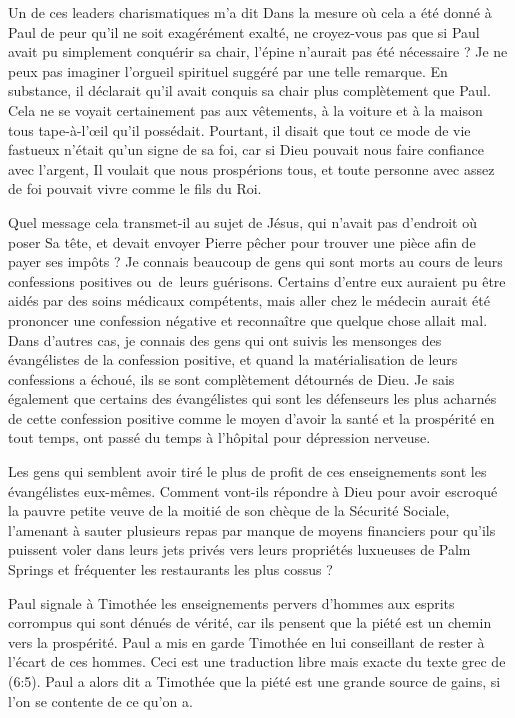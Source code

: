 Un de ces leaders charismatiques m'a dit\frcolon{}
 \Og Dans la mesure où cela a été donné à Paul de peur
 qu'il ne soit exagérément exalté, ne croyez-vous pas que si Paul
 avait pu simplement conquérir sa chair, l'épine n'aurait pas
 été nécessaire ? \Fg{}
 Je ne peux pas imaginer l'orgueil spirituel suggéré par une telle remarque.
 En substance, il déclarait qu'il avait conquis sa chair
 plus complètement que Paul. Cela ne se voyait certainement pas
 aux vêtements, à la voiture et à la maison tous tape-à-l'œil
 qu'il possédait. Pourtant, il disait que tout ce mode de vie
 fastueux n'était qu'un signe de sa foi, car si Dieu pouvait nous faire
 confiance avec l'argent, Il voulait que nous prospérions tous,
 et toute personne avec assez de foi pouvait vivre comme le fils du Roi.

Quel message cela transmet-il au sujet de Jésus, qui n'avait pas
 d'endroit où poser Sa tête, et devait envoyer Pierre pêcher
 pour trouver une pièce afin de payer ses impôts ? Je connais beaucoup de gens
 qui sont morts au cours de leurs confessions positives ou~de~leurs guérisons.
 Certains d'entre eux auraient pu être aidés par des soins médicaux
 compétents, mais aller chez le médecin aurait été prononcer une confession négative
 et reconnaître que quelque chose allait mal.
 Dans d'autres cas, je connais des gens qui ont suivis les mensonges
 des évangélistes de la confession positive, et quand la matérialisation
 de leurs confessions a échoué, ils se sont complètement détournés de Dieu.
 Je sais également que certains des évangélistes qui sont les défenseurs
 les plus acharnés de cette confession positive comme le moyen d'avoir la santé
 et la prospérité en tout temps, ont passé du temps à l'hôpital
 pour dépression nerveuse.

Les gens qui semblent avoir tiré le plus de profit de ces enseignements
 sont les évangélistes eux-mêmes. Comment vont-ils répondre à Dieu
 pour avoir escroqué la pauvre petite veuve de la moitié de son chèque
 de la Sécurité Sociale, l'amenant à sauter plusieurs repas par manque
 de moyens financiers pour qu'ils puissent voler dans leurs jets privés
 vers leurs propriétés luxueuses de Palm Springs et fréquenter les
 restaurants les plus cossus ?

Paul signale à Timothée les enseignements pervers
 d'hom\-mes aux esprits corrompus qui sont dénués de vérité, car ils pensent
 que la piété est un chemin vers la prospérité.
 Paul a mis en garde Timothée en lui conseillant de rester à l'écart de ces hommes.
 Ceci est une traduction libre mais exacte du texte grec
 de (6:5).
 Paul a alors dit a Timothée que la piété est une grande source de gains,
 si l'on se contente de ce qu'on a.
\closechapter

